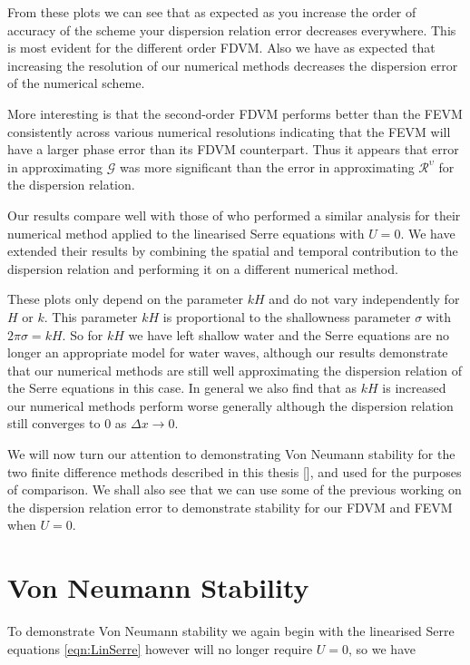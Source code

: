 From these plots we can see that as expected as you increase the order of accuracy of the scheme your dispersion relation error decreases everywhere. This is most evident for the different order FDVM. Also we have as expected that increasing the resolution of our numerical methods decreases the dispersion error of the numerical scheme. 

More interesting is that the second-order FDVM performs better than the FEVM consistently across various numerical resolutions indicating that the FEVM will have a larger phase error than its FDVM counterpart. Thus it appears that error in approximating $\mathcal{G}$ was more significant than the error in approximating $\mathcal{R}^{\upsilon}$ for the dispersion relation.

Our results compare well with those of \cite{Filippini-etal-2016-381} who performed a similar analysis for their numerical method applied to the linearised Serre equations with $U=0$. We have extended their results by combining the spatial and temporal contribution to the dispersion relation and performing it on a different numerical method. 

These plots only depend on the parameter $kH$ and do not vary independently for $H$ or $k$. This parameter $kH$ is proportional to the shallowness parameter $\sigma$ with $2 \pi \sigma = kH $. So for $kH$ we have left shallow water and the Serre equations are no longer an appropriate model for water waves, although our results demonstrate that our numerical methods are still well approximating the dispersion relation of the Serre equations in this case. In general we also find that as $kH$ is increased our numerical methods perform worse generally although the dispersion relation still converges to $0$ as $\Delta x \rightarrow 0$. 

We will now turn our attention to demonstrating Von Neumann stability for the two finite difference methods described in this thesis [], and used for the purposes of comparison. We shall also see that we can use some of the previous working on the dispersion relation error to demonstrate stability for our FDVM and FEVM when $U=0$. 



\section{Von Neumann Stability}
To demonstrate Von Neumann stability we again begin with the linearised Serre equations \eqref{eqn:LinSerre} however will no longer require $U=0$, so we have

